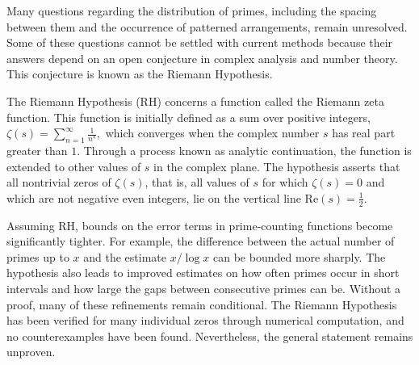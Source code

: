 Many questions regarding the distribution of primes, including the spacing between them and the occurrence of patterned arrangements, remain unresolved. Some of these questions cannot be settled with current methods because their answers depend on an open conjecture in complex analysis and number theory. This conjecture is known as the Riemann Hypothesis.

The Riemann Hypothesis (RH) concerns a function called the Riemann zeta function. This function is initially defined as a sum over positive integers, $\zeta(s) = \sum_{n=1}^\infty \frac{1}{n^s},$
which converges when the complex number $s$ has real part greater than $1$. Through a process known as analytic continuation, the function is extended to other values of $s$ in the complex plane. The hypothesis asserts that all nontrivial zeros of $\zeta(s)$, that is, all values of $s$ for which $\zeta(s) = 0$ and which are not negative even integers, lie on the vertical line $\mathrm{Re}(s) = \tfrac{1}{2}$.

Assuming RH, bounds on the error terms in prime-counting functions become significantly tighter. For example, the difference between the actual number of primes up to $x$ and the estimate $x / \log x$ can be bounded more sharply. The hypothesis also leads to improved estimates on how often primes occur in short intervals and how large the gaps between consecutive primes can be. Without a proof, many of these refinements remain conditional. The Riemann Hypothesis has been verified for many individual zeros through numerical computation, and no counterexamples have been found. Nevertheless, the general statement remains unproven.

